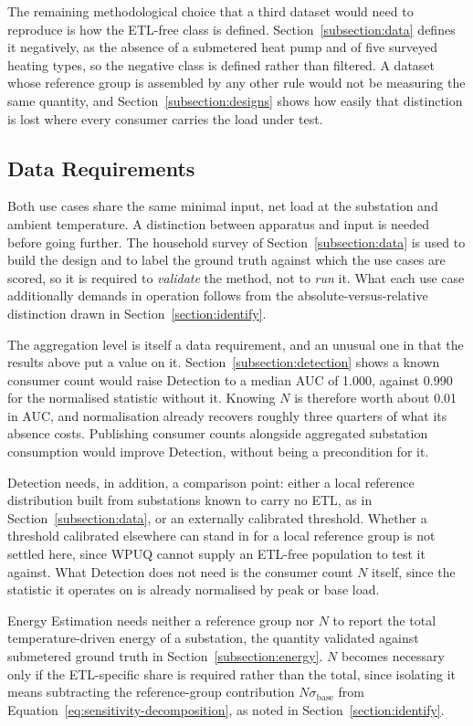 \documentclass[9pt,journal,a4]{IEEEtran}
\begin{document}
The remaining methodological choice that a third dataset would need to reproduce is how the ETL-free class is defined. Section~\ref{subsection:data} defines it negatively, as the absence of a submetered heat pump and of five surveyed heating types, so the negative class is defined rather than filtered. A dataset whose reference group is assembled by any other rule would not be measuring the same quantity, and Section~\ref{subsection:designs} shows how easily that distinction is lost where every consumer carries the load under test.

\subsection{Data Requirements}

Both use cases share the same minimal input, net load at the substation and ambient temperature. A distinction between apparatus and input is needed before going further. The household survey of Section~\ref{subsection:data} is used to build the design and to label the ground truth against which the use cases are scored, so it is required to \emph{validate} the method, not to \emph{run} it. What each use case additionally demands in operation follows from the absolute-versus-relative distinction drawn in Section~\ref{section:identify}.

The aggregation level is itself a data requirement, and an unusual one in that the results above put a value on it. Section~\ref{subsection:detection} shows a known consumer count would raise Detection to a median AUC of 1.000, against 0.990 for the normalised statistic without it. Knowing $N$ is therefore worth about 0.01 in AUC, and normalisation already recovers roughly three quarters of what its absence costs. Publishing consumer counts alongside aggregated substation consumption would improve Detection, without being a precondition for it.

Detection needs, in addition, a comparison point: either a local reference distribution built from substations known to carry no ETL, as in Section~\ref{subsection:data}, or an externally calibrated threshold. Whether a threshold calibrated elsewhere can stand in for a local reference group is not settled here, since WPUQ cannot supply an ETL-free population to test it against. What Detection does not need is the consumer count $N$ itself, since the statistic it operates on is already normalised by peak or base load.

Energy Estimation needs neither a reference group nor $N$ to report the total temperature-driven energy of a substation, the quantity validated against submetered ground truth in Section~\ref{subsection:energy}. $N$ becomes necessary only if the ETL-specific share is required rather than the total, since isolating it means subtracting the reference-group contribution $N \sigma_{\mathrm{base}}$ from Equation~\eqref{eq:sensitivity-decomposition}, as noted in Section~\ref{section:identify}.
\end{document}
